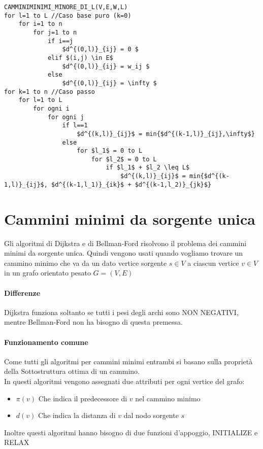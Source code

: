 \documentclass[12pt, a4paper, openany]{book}
\begin{document}
\begin{lstlisting}
CAMMINIMINIMI_MINORE_DI_L(V,E,W,L)
for l=1 to L //Caso base puro (k=0)
    for i=1 to n
        for j=1 to n
            if i==j
                $d^{(0,l)}_{ij} = 0 $
            elif $(i,j) \in E$
                $d^{(0,l)}_{ij} = w_ij $
            else
                $d^{(0,l)}_{ij} = \infty $
for k=1 to n //Caso passo
    for l=1 to L
        for ogni i
            for ogni j
                if l==1
                    $d^{(k,l)}_{ij}$ = min{$d^{(k-1,l)}_{ij},\infty$} 
                else
                    for $l_1$ = 0 to L
                        for $l_2$ = 0 to L
                            if $l_1$ + $l_2 \leq L$
                                $d^{(k,l)}_{ij}$ = min{$d^{(k-1,l)}_{ij}$, $d^{(k-1,l_1)}_{ik}$ + $d^{(k-1,l_2)}_{jk}$} 
\end{lstlisting}

\section{Cammini minimi da sorgente unica}
Gli algoritmi di Dijkstra e di Bellman-Ford risolvono il problema dei cammini minimi da sorgente unica.
Quindi vengono usati quando vogliamo trovare un cammino minimo che va da un dato vertice sorgente $s \in V$ a
ciascun vertice $v \in V$ in un grafo orientato pesato $G = (V, E)$

\paragraph{Differenze}
Dijkstra funziona soltanto se tutti i pesi degli archi sono NON NEGATIVI, mentre
Bellman-Ford non ha bisogno di questa premessa.

\paragraph{Funzionamento comune}
Come tutti gli algoritmi per cammini minimi entrambi si basano sulla
proprietà della Sottostruttura ottima di un cammino.\\
In questi algoritmi vengono assegnati due attributi per ogni vertice del grafo:
\begin{itemize}
	\item $\pi(v)$ Che indica il predecessore di $v$ nel cammino minimo
	\item $d(v)$ Che indica la distanza di $v$ dal nodo sorgente $s$
\end{itemize}

Inoltre questi algoritmi hanno bisogno di due funzioni d'appoggio, INITIALIZE e RELAX
\end{document}
